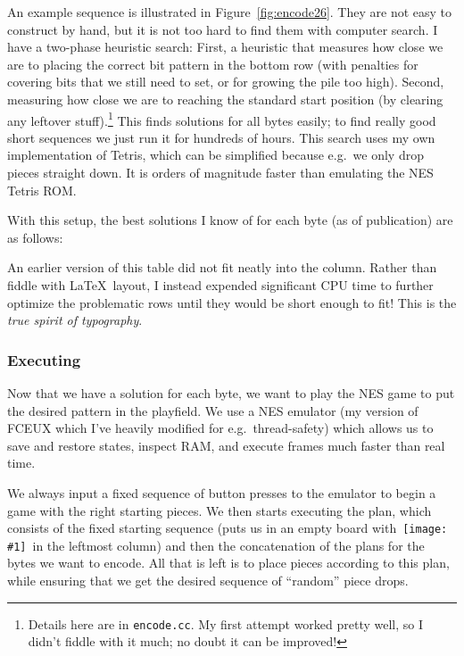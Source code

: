 \documentclass[twocolumn]{article}
\newcommand\tetrispiece[1]{\,\texttt{[image: \#1]}\hspace{0.1em}}
\newcommand\svert{\tetrispiece{s_vert}}
\begin{document}
An example sequence is illustrated in Figure~\ref{fig:encode26}. They
are not easy to construct by hand, but it is not too hard to find them
with computer search. I have a two-phase heuristic search: First,
a heuristic that measures how close we are to placing the correct bit
pattern in the bottom row (with penalties for covering bits that we
still need to set, or for growing the pile too high). Second, measuring
how close we are to reaching the standard start position (by clearing
any leftover stuff).\!\footnote{Details here are in {\tt encode.cc}.
  My first attempt worked pretty well, so I didn't fiddle with it
  much; no doubt it can be improved!} This finds solutions for all
bytes easily; to find really good short sequences we just run it for
hundreds of hours. This search uses my own implementation of Tetris,
which can be simplified because e.g.~we only drop pieces straight down.
It is orders of magnitude faster than emulating the NES Tetris ROM.

With this setup, the best solutions I know of for each byte (as of
publication) are as follows:




An earlier version of this table did not fit neatly into the column.
Rather than fiddle with \LaTeX\ layout, I instead expended significant
CPU time to further optimize the problematic rows until they would
be short enough to fit! This is the {\em true spirit of typography}.

\subsubsection{Executing}

Now that we have a solution for each byte, we want to play the NES
game to put the desired pattern in the playfield. We use a NES
emulator (my version of FCEUX\cite{fceux} which I've heavily modified
for e.g.~thread-safety) which allows us to save and restore states,
inspect RAM, and execute frames much faster than real time.

We always input a fixed sequence of button presses to the emulator to
begin a game with the right starting pieces. We then starts executing
the plan, which consists of the fixed starting sequence (puts us in an
empty board with \svert\ in the leftmost column) and then the
concatenation of the plans for the bytes we want to encode. All that
is left is to place pieces according to this plan, while ensuring that
we get the desired sequence of ``random'' piece drops.
\end{document}
